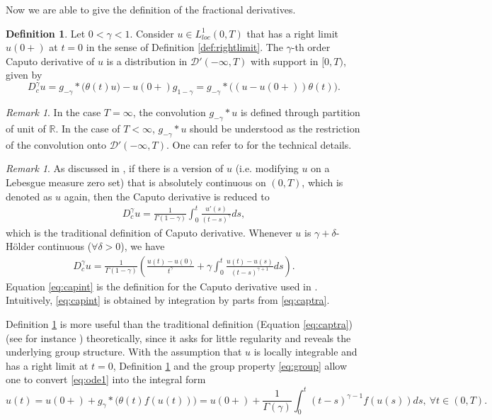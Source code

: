 \documentclass[12pt]{amsart}%
\theoremstyle{definition}
\newtheorem{definition}[thm]{Definition}
\theoremstyle{remark}
\newtheorem{rmk}[thm]{Remark}
\begin{document}
Now we are able to give the definition of the fractional derivatives.
\begin{definition}\label{def:caputo}
Let $0<\gamma<1$. Consider $u\in L_{loc}^1(0, T)$ that has a right limit $u(0+)$ at $t=0$ in the sense of Definition \ref{def:rightlimit}. The $\gamma$-th order Caputo derivative of $u$ is a distribution in $\mathscr{D}'(-\infty, T)$ with support in $[0, T)$, given by 
\[
D_c^{\gamma}u=g_{-\gamma}*\Big(\theta(t)u\Big)-u(0+)g_{1-\gamma}
=g_{-\gamma}*\Big((u-u(0+))\theta(t)\Big).
\]
\end{definition}
\begin{rmk}
In the case $T=\infty$, the convolution $g_{-\gamma}*u$ is defined through partition of unit of $\mathbb{R}$. In the case of $T<\infty$, $g_{-\gamma}*u$ should be understood as the restriction of the convolution onto $\mathscr{D}'(-\infty,T)$. One can refer to \cite{liliu16} for the technical details. 
\end{rmk}
\begin{rmk}
As discussed in \cite{liliu16}, if there is a version of $u$ (i.e. modifying $u$ on a Lebesgue measure zero set) that is absolutely continuous on $(0, T)$, which is denoted as $u$ again,  then the Caputo derivative is reduced to 
\begin{gather}\label{eq:captra}
D_c^{\gamma}u=\frac{1}{\Gamma(1-\gamma)}\int_0^t\frac{u'(s)}{(t-s)^{\gamma}}ds,
\end{gather}
which is the traditional definition of Caputo derivative. Whenever $u$ is $\gamma+\delta$-H\"older continuous ($\forall \delta>0$), we have
\begin{gather}\label{eq:capint}
D_c^{\gamma}u=\frac{1}{\Gamma(1-\gamma)}\left(\frac{u(t)-u(0)}{t^{\gamma}}+\gamma \int_0^t\frac{u(t)-u(s)}{(t-s)^{\gamma+1}}ds\right).
\end{gather}
Equation \eqref{eq:capint} is the definition for the Caputo derivative used in \cite{ala16}. Intuitively, \eqref{eq:capint} is obtained by integration by parts from \eqref{eq:captra}.
\end{rmk}
Definition \ref{def:caputo} is more useful than the traditional definition (Equation \eqref{eq:captra}) (see for instance \cite{gm97, df02, kst06,mpg07,diethelm10, taylorremarks}) theoretically, since it asks for little regularity and reveals the underlying group structure. With the assumption that $u$ is locally integrable and has a right limit at $t=0$, Definition \ref{def:caputo} and the group property \eqref{eq:group} allow one to convert \eqref{eq:ode1} into the integral form 
\begin{equation}\label{eq:vol}
u(t)=u(0+)+g_{\gamma}*\Big(\theta(t)f(u(t))\Big)=u(0+)+\frac{1}{\Gamma(\gamma)}\int_0^t(t-s)^{\gamma-1}f(u(s))ds,
~\forall t\in (0, T).
\end{equation}
\end{document}
